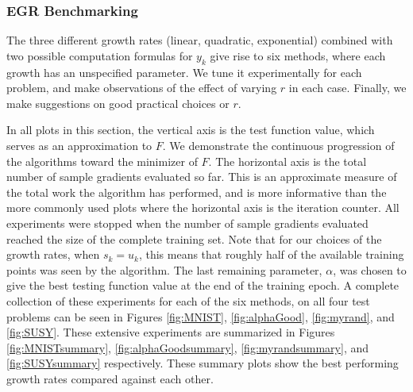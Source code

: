 \documentclass[11pt]{article}
\begin{document}
   
   \subsubsection{EGR Benchmarking}
   
   The three different growth rates (linear, quadratic, exponential) combined with two possible computation formulas for $y_k$ give rise to six methods, where each growth has an unspecified parameter. We tune it experimentally for each problem, and make observations of the effect of varying $r$ in each case. Finally, we make suggestions on good practical choices or $r$. 
   
   In all plots in this section, the vertical axis is the test function value, which serves as an approximation to $F$. We demonstrate the continuous progression of the algorithms toward the minimizer of $F$. The horizontal axis is the total number of sample gradients evaluated so far. This is an approximate measure of the total work the algorithm has performed, and is more informative than the more commonly used plots where the horizontal axis is the iteration counter. All experiments were stopped when the number of sample gradients evaluated reached the size of the complete training set. Note that for our choices of the growth rates, when $s_k=u_k$, this means that roughly half of the available training points was seen by the algorithm. 
  The last remaining parameter, $\alpha$, was chosen to give the best testing function value at the end of the training epoch. A complete collection of these experiments for each of the six methods, on all four test problems can be seen in Figures \ref{fig:MNIST}, \ref{fig:alphaGood}, \ref{fig:myrand}, and \ref{fig:SUSY}. These extensive experiments are summarized in Figures \ref{fig:MNISTsummary}, \ref{fig:alphaGoodsummary}, \ref{fig:myrandsummary}, and \ref{fig:SUSYsummary} respectively. These summary plots show the best performing growth rates compared against each other. 

   
\end{document}
